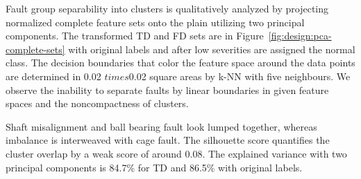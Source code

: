 Fault group separability into clusters is qualitatively analyzed by projecting normalized complete feature sets onto the plain utilizing two principal components. The transformed TD and FD sets are in Figure~\ref{fig:design:pca-complete-sets} with original labels and after low severities are assigned the normal class. The decision boundaries that color the feature space around the data points are determined in 0.02 $times$0.02 square areas by k-NN with five neighbours. We observe the inability to separate faults by linear boundaries in given feature spaces and the noncompactness of clusters.

Shaft misalignment and ball bearing fault look lumped together, whereas imbalance is interweaved with cage fault. The silhouette score quantifies the cluster overlap by a weak score of around 0.08. The explained variance with two principal components is 84.7\% for TD and 86.5\% with original labels.

